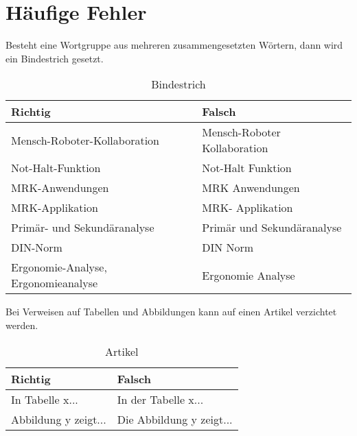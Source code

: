 \newpage
\section{Häufige Fehler}

\noindent
Besteht eine Wortgruppe aus mehreren zusammengesetzten Wörtern, dann wird ein Bindestrich gesetzt.

\renewcommand{\arraystretch}{1.2}
\begin{table}[H]
	  \centering
		\caption{Bindestrich}
		\begin{tabular}{|p{}|p{}|}
			\hline
			\textbf{Richtig} & \textbf{Falsch} \tabularnewline
			 \hline
					Mensch-Roboter-Kollaboration & Mensch-Roboter Kollaboration \\	
					Not-Halt-Funktion & Not-Halt Funktion \\
					MRK-Anwendungen & MRK Anwendungen \\
					MRK-Applikation & MRK- Applikation \\
					Primär- und Sekundäranalyse & Primär und Sekundäranalyse \\		
					DIN-Norm & DIN Norm \\			
					Ergonomie-Analyse, Ergonomieanalyse & Ergonomie Analyse \\
				\hline
		\end{tabular}	
\end{table}
\renewcommand{\arraystretch}{1}

\noindent
Bei Verweisen auf Tabellen und Abbildungen kann auf einen Artikel verzichtet werden.

\renewcommand{\arraystretch}{1.2}
\begin{table}[H]
	  \centering
		\caption{Artikel}
		\begin{tabular}{|p{}|p{}|}
			\hline
			\textbf{Richtig} & \textbf{Falsch} \tabularnewline
			 \hline
					In Tabelle x... & In der Tabelle x... \\
					Abbildung y zeigt... & Die Abbildung y zeigt... \\
				\hline
		\end{tabular}	
\end{table}
\renewcommand{\arraystretch}{1}

